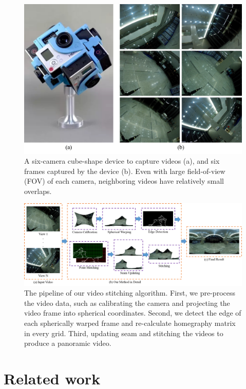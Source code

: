 \documentclass[conference]{IEEEtran}
\begin{document}
\begin{figure}[t]
\centering
\includegraphics[scale=0.36]{picture34.png}
\caption{A six-camera cube-shape device to capture videos (a), and six frames captured by the device (b). Even with large field-of-view (FOV) of each camera, neighboring videos have relatively small overlaps. }
\label{fig:equipment}
\end{figure}

\begin{figure}
\centering
\includegraphics[scale=0.54]{picture44.png}
\caption{The pipeline of our video stitching algorithm. First, we pre-process the video data, such as calibrating the camera
and projecting the video frame into spherical coordinates. Second, we detect the edge of each spherically
warped frame and re-calculate
homegraphy matrix in every grid. Third, updating seam and stitching the videos to produce a panoramic video.}
\label{fig:res}
\end{figure}

\section{Related work}
\label{sec:related}
\end{document}
